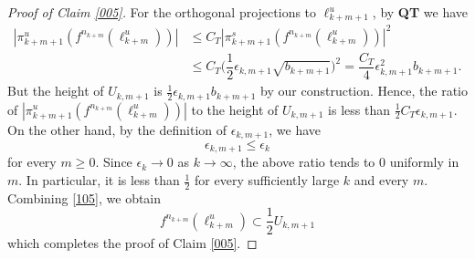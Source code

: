 \documentclass{amsart}
\theoremstyle{plain}
\theoremstyle{definition}
\theoremstyle{remark}
\numberwithin{equation}{section}
\begin{document}
\begin{proof}[Proof of Claim \ref{005}]
For the orthogonal projections to $\ell^u_{k+m+1}$, by {\bf QT} we have
\begin{align*}
|\pi^u_{k+m+1}(f^{n_{k+m}}(\ell^u_{k+m}))|
&\le C_T |\pi^s_{k+m+1}(f^{n_{k+m}}(\ell^u_{k+m}))|^2
\\
&\le C_T  \Big(\dfrac{1}{2}\epsilon_{k,m+1}\sqrt{b_{k+m+1}}\Big)^2 
= \dfrac{C_T}{4} \epsilon^2_{k,m+1}b_{k+m+1}.
\end{align*}
But the height of $U_{k,m+1}$ is $\frac{1}{2}\epsilon_{k,m+1}b_{k+m+1}$ by our construction. Hence, the ratio of $|\pi^u_{k+m+1}(f^{n_{k+m}}(\ell^u_{k+m}))|$ to the height of $U_{k,m+1}$ is less than
$
\frac{1}{2}C_T\epsilon_{k,m+1}.
$
On the other hand, by the definition of
$\epsilon_{k,m+1}$, we have
\[
\epsilon_{k,m+1}\le \epsilon_k
\]
for every $m\ge 0$. Since $\epsilon_k\to 0$ as $k\to\infty$, the above ratio tends to $0$ uniformly in $m$. In particular, it is less than $\frac{1}{2}$ for every sufficiently large $k$ and every $m$. Combining \eqref{105}, we obtain
\[f^{n_{k+m}}(\ell^u_{k+m})\subset\frac{1}{2}U_{k,m+1}\] which completes the proof of Claim \ref{005}.
\end{proof}
\end{document}
